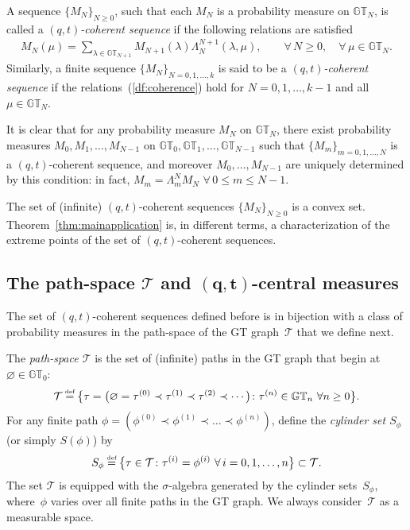 \documentclass[pdftex]{sigma}
\numberwithin{equation}{section}
\newcommand\myeq{\mathrel{\stackrel{\makebox[0pt]{\mbox{\normalfont\tiny def}}}{=}}}
\newcommand{\GT}{\mathbb{GT}}
\newcommand{\Tau}{\mathcal{T}}
\begin{document}
\begin{df}
A sequence $\{M_N\}_{N\geq 0}$, such that each $M_N$ is a probability measure on $\GT_N$, is called a \textit{$(q, t)$-coherent sequence} if the following relations are satisf\/ied
\begin{gather}\label{df:coherence}
M_N(\mu) = \sum_{\lambda\in\GT_{N+1}}{M_{N+1}(\lambda) \Lambda^{N+1}_N(\lambda, \mu)}, \qquad \forall\, N\geq 0, \quad \forall\, \mu\in\GT_N.
\end{gather}
Similarly, a f\/inite sequence $\{M_N\}_{N = 0, 1, \dots, k}$ is said to be a \textit{$(q, t)$-coherent sequence} if the relations~(\ref{df:coherence}) hold for $N = 0, 1, \dots, k-1$ and all $\mu\in\GT_N$.
\end{df}

It is clear that for any probability measure $M_N$ on $\GT_N$, there exist probability measures $M_0, M_1, \dots, M_{N-1}$ on $\GT_0, \GT_1, \dots, \GT_{N-1}$ such that $\{M_m\}_{m = 0, 1, \dots, N}$ is a $(q, t)$-coherent sequence, and moreover $M_0, \dots, M_{N-1}$ are uniquely determined by this condition: in fact, $M_m = \Lambda^N_m M_N$ $\forall \, 0\leq m\leq N-1$.

The set of (inf\/inite) $(q, t)$-coherent sequences $\{M_N\}_{N\geq 0}$ is a convex set. Theorem~\ref{thm:mainapplication} is, in dif\/ferent terms, a characterization of the extreme points of the set of $(q, t)$-coherent sequences.

\subsection[The path-space $\Tau$ and $(q, t)$-central measures]{The path-space $\boldsymbol{\Tau}$ and $\boldsymbol{(q, t)}$-central measures}\label{sec:central}

The set of $(q, t)$-coherent sequences def\/ined before is in bijection with a class of probability measures in the path-space of the GT graph~$\Tau$ that we def\/ine next.

\begin{df}The \textit{path-space $\Tau$} is the set of (inf\/inite) paths in the GT graph that begin at $\varnothing\in\GT_0$:
\begin{gather*}
\Tau \myeq \big\{\tau = \big(\varnothing = \tau^{(0)} \prec \tau^{(1)} \prec \tau^{(2)} \prec \cdots\big)\colon \tau^{(n)}\in\GT_n \ \forall n \geq 0\big\}.
\end{gather*}
For any f\/inite path $\phi = (\phi^{(0)} \prec \phi^{(1)} \prec \dots \prec \phi^{(n)})$, def\/ine the \textit{cylinder set $S_{\phi}$} (or simply $S(\phi)$) by
\begin{gather*}
S_{\phi} \myeq \big\{\tau\in\Tau\colon \tau^{(i)} = \phi^{(i)} \ \forall \, i = 0, 1, \dots, n\big\} \subset \Tau.
\end{gather*}
The set $\Tau$ is equipped with the $\sigma$-algebra generated by the cylinder sets~$S_{\phi}$, where~$\phi$ varies over all f\/inite paths in the GT graph. We always consider~$\Tau$ as a measurable space.
\end{df}
\end{document}
